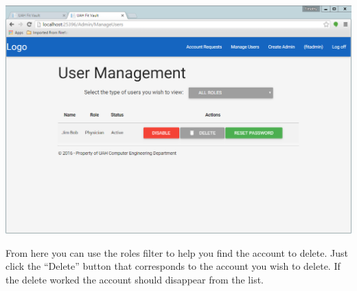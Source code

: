\documentclass[letterpaper,10pt,english]{sphinxmanual}
\begin{document}
\includegraphics{manage_users.png}

From here you can use the roles filter to help you find the account to delete. Just click the ``Delete'' button that
corresponds to the account you wish to delete. If the delete worked the account should disappear from the list.
\end{document}

